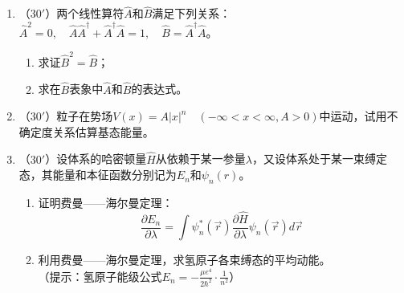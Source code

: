 
\begin{enumerate}
	\item
（$30'$）两个线性算符$\hat{A}$和$\hat{B}$满足下列关系：$\hat{A}^2=0,\quad \hat{A}\hat{A}^\dagger+\hat{A}^\dagger \hat{A}=1,\quad \hat{B}=\hat{A}^\dagger\hat{A}$。
\begin{enumerate}
	\item
求证$\hat{B}^2=\hat{B}$；

\item 
求在$\hat{B}$表象中$\hat{A}$和$\hat{B}$的表达式。
	
\end{enumerate}


\banswer{
	
}


\item 
（$30'$）粒子在势场$V(x)=A|x|^n\quad(-\infty <x<\infty,A>0)$中运动，试用不确定度关系估算基态能量。

\banswer{
	
}


\item 
（$30'$）设体系的哈密顿量$\hat{H}$从依赖于某一参量$\lambda$，又设体系处于某一束缚定态，其能量和本征函数分别记为$E_n$和$\psi_n(r)$。
\begin{enumerate}
	\item
证明费曼——海尔曼定理：
$$\frac{\partial E_n}{\partial \lambda}=\int \psi^*_n(\vec{r})\frac{\partial \hat{H}}{\partial \lambda}\psi_n(\vec{r})d\vec{r}$$

\item 
利用费曼——海尔曼定理，求氢原子各束缚态的平均动能。\\
（提示：氢原子能级公式$E_n=-\frac{\mu e^4}{2\hbar^2}\cdot\frac{1}{n^2}$）
	

\end{enumerate}
\end{enumerate}
